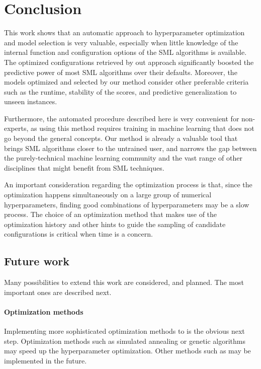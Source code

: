 \chapter{Conclusion}

This work shows that an automatic approach to hyperparameter optimization and model selection is
very valuable, especially when little knowledge of the internal function and configuration options of
the SML algorithms is available. The optimized configurations retrieved by out approach
significantly boosted the predictive power of most SML algorithms over their defaults. Moreover,
the models optimized and selected by our method consider other preferable criteria such as the
runtime, stability of the scores, and predictive generalization to unseen instances.

Furthermore, the automated procedure described here is very convenient for non-experts,
as using this method requires training in machine learning that does not go
beyond the general concepts. Our method is already a valuable tool that brings SML
algorithms closer to the untrained user, and narrows the gap between the purely-technical
machine learning community and the vast range of other disciplines that might benefit from SML
techniques.

An important consideration regarding the optimization process is that, since the optimization
happens simultaneously on a large group of numerical hyperparameters, finding good combinations of
hyperparameters may be a slow process. The choice of an optimization method that makes use of the
optimization history and other hints to guide the sampling of candidate configurations is critical
when time is a concern.

\section{Future work}
	Many possibilities to extend this work are considered, and planned. The most important ones are
	described next.

	\subsubsection{Optimization methods}
	Implementing more sophisticated optimization methods to is the obvious next step. Optimization methods such
	as simulated annealing or genetic algorithms may speed up the hyperparameter optimization. Other
	methods such as may be implemented in the future.

